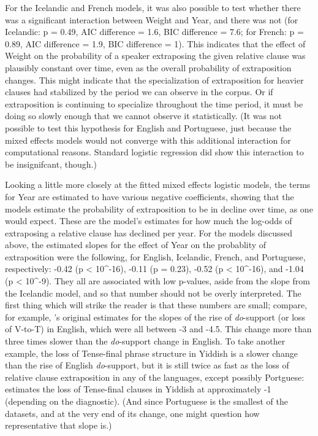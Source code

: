 For the Icelandic and French models, it was also possible to test whether there was a significant interaction between Weight and Year, and there was not (for Icelandic: p = 0.49, AIC difference = 1.6, BIC difference = 7.6; for French: p = 0.89, AIC difference = 1.9, BIC difference = 1). This indicates that the effect of Weight on the probability of a speaker extraposing the given relative clause was plausibly constant over time, even as the overall probability of extraposition changes. This might indicate that the specialization of extraposition for heavier clauses had stabilized by the period we can observe in the corpus. Or if extraposition is continuing to specialize throughout the time period, it must be doing so slowly enough that we cannot observe it statistically. (It was not possible to test this hypothesis for English and Portuguese, just because the mixed effects models would not converge with this additional interaction for computational reasons. Standard logistic regression did show this interaction to be insignifcant, though.)


Looking a little more closely at the fitted mixed effects logistic models, the terms for Year are estimated to have various negative coefficients, showing that the models estimate the probability of extraposition to be in decline over time, as one would expect. These are the model's estimates for how much the log-odds of extraposing a relative clause has declined per year. For the models discussed above, the estimated slopes for the effect of Year on the probablity of extraposition were the following, for English, Icelandic, French, and Portuguese, respectively: -0.42 (p < 10^{-16}), -0.11 (p = 0.23), -0.52 (p < 10^{-16}), and -1.04 (p < 10^{-9}). They all are associated with low p-values, aside from the slope from the Icelandic model, and so that number should not be overly interpreted.
The first thing which will strike the reader is that these numbers are small; compare, for example, \citealt{kroch1989}'s original estimates for the slopes of the rise of \textsl{do}-support (or loss of V-to-T) in English, which were all between -3 and -4.5. This change more than three times slower than the \textsl{do}-support change in English. To take another example, the loss of Tense-final phrase structure in Yiddish is a slower change than the rise of English \textsl{do}-support, but it is still twice as fast as the loss of relative clause extraposition in any of the languages, except possibly Portguese: \citet{santorini1993a} estimates the loss of Tense-final clauses in Yiddish at approximately -1 (depending on the diagnostic). (And since Portuguese is the smallest of the datasets, and at the very end of its change, one might question how representative that slope is.)

